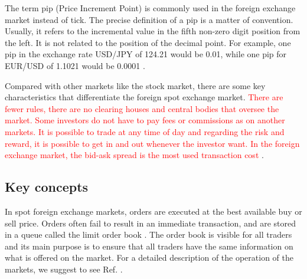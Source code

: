 The term pip (Price Increment Point) is commonly used in the foreign exchange
market instead of tick. The precise definition of a pip is a matter of
convention. Usually, it refers to the incremental value in the fifth non-zero
digit position from the left. It is not related to the position of the decimal
point. For example, one pip in the exchange rate USD/JPY of 124.21 would be
0.01, while one pip for EUR/USD of 1.1021 would be 0.0001
\cite{forex_structure,micro_eff,forex_market_micro,book_forex_3,order_flow_forex}.

Compared with other markets like the stock market, there are some key
characteristics that differentiate the foreign spot exchange market.
\textcolor{red}{There are
fewer rules, there are no clearing houses and central bodies that oversee the
market. Some investors do not have to pay fees or commissions as on another markets.
It is possible to trade at any time of day and regarding the risk and reward,
it is possible to get in and out whenever the investor want. In the foreign
exchange market, the bid-ask spread is the most used transaction cost
\cite{book_forex_2}}.

\subsection{Key concepts}\label{subsec:key_concepts}

In spot foreign exchange markets, orders are executed at the best available buy
or sell price. Orders often fail to result in an immediate transaction, and are
stored in a queue called the limit order book
\cite{forex_structure,forex_market_micro,stat_prop,predictive_pow,intro_market_micro,prop_order_book}.
The order book is visible for all traders and its main purpose is to ensure
that all traders have the same information on what is offered on the market.
For a detailed description of the operation of the markets, we suggest to see
Ref. \cite{my_paper_response_financial}.

